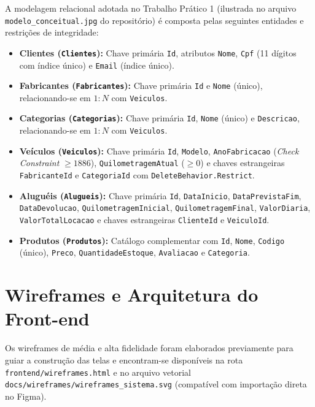\documentclass[12pt]{article}
\begin{document}
A modelagem relacional adotada no Trabalho Prático 1 (ilustrada no arquivo \texttt{modelo\_conceitual.jpg} do repositório) é composta pelas seguintes entidades e restrições de integridade:

\begin{itemize}
  \item \textbf{Clientes (\texttt{Clientes}):} Chave primária \texttt{Id}, atributos \texttt{Nome}, \texttt{Cpf} (11 dígitos com índice único) e \texttt{Email} (índice único).
  \item \textbf{Fabricantes (\texttt{Fabricantes}):} Chave primária \texttt{Id} e \texttt{Nome} (único), relacionando-se em $1:N$ com \texttt{Veiculos}.
  \item \textbf{Categorias (\texttt{Categorias}):} Chave primária \texttt{Id}, \texttt{Nome} (único) e \texttt{Descricao}, relacionando-se em $1:N$ com \texttt{Veiculos}.
  \item \textbf{Veículos (\texttt{Veiculos}):} Chave primária \texttt{Id}, \texttt{Modelo}, \texttt{AnoFabricacao} (\textit{Check Constraint} $\ge 1886$), \texttt{QuilometragemAtual} ($\ge 0$) e chaves estrangeiras \texttt{FabricanteId} e \texttt{CategoriaId} com \texttt{DeleteBehavior.Restrict}.
  \item \textbf{Aluguéis (\texttt{Alugueis}):} Chave primária \texttt{Id}, \texttt{DataInicio}, \texttt{DataPrevistaFim}, \texttt{DataDevolucao}, \texttt{QuilometragemInicial}, \texttt{QuilometragemFinal}, \texttt{ValorDiaria}, \texttt{ValorTotalLocacao} e chaves estrangeiras \texttt{ClienteId} e \texttt{VeiculoId}.
  \item \textbf{Produtos (\texttt{Produtos}):} Catálogo complementar com \texttt{Id}, \texttt{Nome}, \texttt{Codigo} (único), \texttt{Preco}, \texttt{QuantidadeEstoque}, \texttt{Avaliacao} e \texttt{Categoria}.
\end{itemize}

\section{Wireframes e Arquitetura do Front-end}

Os wireframes de média e alta fidelidade foram elaborados previamente para guiar a construção das telas e encontram-se disponíveis na rota \texttt{frontend/wireframes.html} e no arquivo vetorial \texttt{docs/wireframes/wireframes\_sistema.svg} (compatível com importação direta no Figma).
\end{document}
